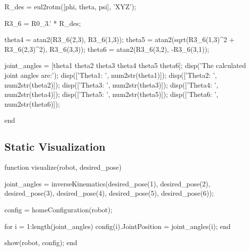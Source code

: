 \documentclass[conference]{IEEEtran}
\begin{document}
\begin{matlabcode}[label={InverseKinCodeAppendix}]
    R_des = eul2rotm([phi, theta, psi], 'XYZ'); %
    
    R3_6 = R0_3.' * R_des; %
    
    theta4 = atan2(R3_6(2,3), R3_6(1,3));
    theta5 = atan2(sqrt(R3_6(1,3)^2 + R3_6(2,3)^2), R3_6(3,3));
    theta6 = atan2(R3_6(3,2), -R3_6(3,1));
    
    joint_angles = [theta1 theta2 theta3 theta4 theta5 theta6];
    disp('The calculated joint angles are:');
    disp(['Theta1: ', num2str(theta1)]);
    disp(['Theta2: ', num2str(theta2)]);
    disp(['Theta3: ', num2str(theta3)]);
    disp(['Theta4: ', num2str(theta4)]);
    disp(['Theta5: ', num2str(theta5)]);
    disp(['Theta6: ', num2str(theta6)]);

end
\end{matlabcode}
\subsection{Static Visualization}
\label{appendix:StaticVis}
\begin{matlabcode}[label={StaticVisAppendix}]
function visualize(robot, desired_pose)
    
    joint_angles = inverseKinematics(desired_pose(1), desired_pose(2), desired_pose(3), desired_pose(4), desired_pose(5), desired_pose(6));
    
    config = homeConfiguration(robot);
    
    for i = 1:length(joint_angles)
        config(i).JointPosition = joint_angles(i);
    end
    
    show(robot, config);
end
\end{matlabcode}
\end{document}
